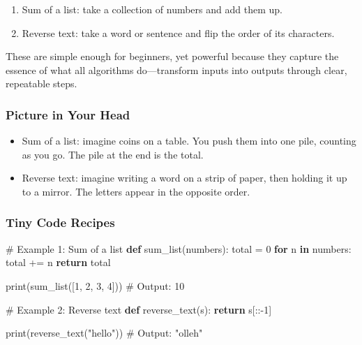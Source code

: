 \documentclass[
  letterpaper,
  DIV=11,
  numbers=noendperiod]{scrreprt}
\newenvironment{Shaded}{\begin{snugshade}}{\end{snugshade}}
\newcommand{\BuiltInTok}[1]{\textcolor[rgb]{0.00,0.23,0.31}{#1}}
\newcommand{\CommentTok}[1]{\textcolor[rgb]{0.37,0.37,0.37}{#1}}
\newcommand{\ControlFlowTok}[1]{\textcolor[rgb]{0.00,0.23,0.31}{\textbf{#1}}}
\newcommand{\DecValTok}[1]{\textcolor[rgb]{0.68,0.00,0.00}{#1}}
\newcommand{\KeywordTok}[1]{\textcolor[rgb]{0.00,0.23,0.31}{\textbf{#1}}}
\newcommand{\NormalTok}[1]{\textcolor[rgb]{0.00,0.23,0.31}{#1}}
\newcommand{\OperatorTok}[1]{\textcolor[rgb]{0.37,0.37,0.37}{#1}}
\newcommand{\StringTok}[1]{\textcolor[rgb]{0.13,0.47,0.30}{#1}}
\providecommand{\tightlist}{%
  \setlength{\itemsep}{0pt}\setlength{\parskip}{0pt}}
\begin{document}
\begin{enumerate}
\def\labelenumi{\arabic{enumi}.}
\tightlist
\item
  Sum of a list: take a collection of numbers and add them up.
\item
  Reverse text: take a word or sentence and flip the order of its
  characters.
\end{enumerate}

These are simple enough for beginners, yet powerful because they capture
the essence of what all algorithms do---transform inputs into outputs
through clear, repeatable steps.

\subsubsection{Picture in Your Head}\label{picture-in-your-head-19}

\begin{itemize}
\tightlist
\item
  Sum of a list: imagine coins on a table. You push them into one pile,
  counting as you go. The pile at the end is the total.
\item
  Reverse text: imagine writing a word on a strip of paper, then holding
  it up to a mirror. The letters appear in the opposite order.
\end{itemize}

\subsubsection{Tiny Code Recipes}\label{tiny-code-recipes-1}

\begin{Shaded}
\begin{Highlighting}[]
\CommentTok{\# Example 1: Sum of a list}
\KeywordTok{def}\NormalTok{ sum\_list(numbers):}
\NormalTok{    total }\OperatorTok{=} \DecValTok{0}
    \ControlFlowTok{for}\NormalTok{ n }\KeywordTok{in}\NormalTok{ numbers:}
\NormalTok{        total }\OperatorTok{+=}\NormalTok{ n}
    \ControlFlowTok{return}\NormalTok{ total}

\BuiltInTok{print}\NormalTok{(sum\_list([}\DecValTok{1}\NormalTok{, }\DecValTok{2}\NormalTok{, }\DecValTok{3}\NormalTok{, }\DecValTok{4}\NormalTok{]))  }\CommentTok{\# Output: 10}
\end{Highlighting}
\end{Shaded}

\begin{Shaded}
\begin{Highlighting}[]
\CommentTok{\# Example 2: Reverse text}
\KeywordTok{def}\NormalTok{ reverse\_text(s):}
    \ControlFlowTok{return}\NormalTok{ s[::}\OperatorTok{{-}}\DecValTok{1}\NormalTok{]}

\BuiltInTok{print}\NormalTok{(reverse\_text(}\StringTok{"hello"}\NormalTok{))   }\CommentTok{\# Output: "olleh"}
\end{Highlighting}
\end{Shaded}
\end{document}
